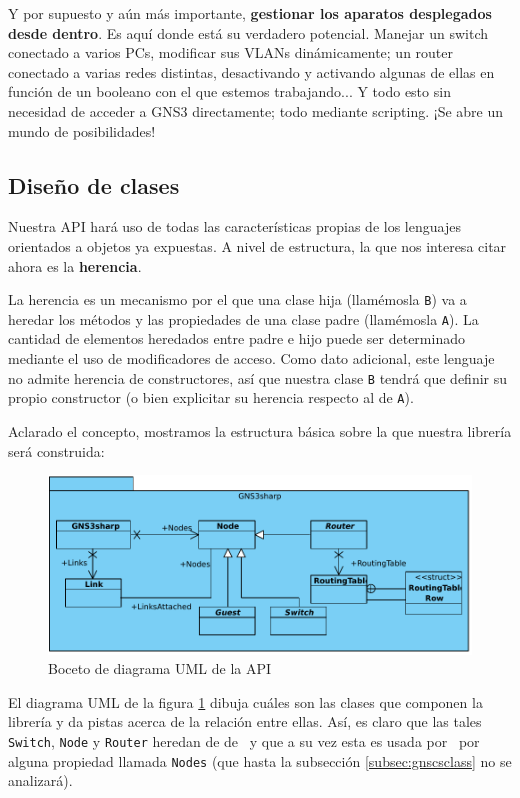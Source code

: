 Y por supuesto y aún más importante, \textbf{gestionar los aparatos desplegados desde dentro}. Es aquí donde está su verdadero potencial. Manejar un switch conectado a varios PCs, modificar sus VLANs dinámicamente; un router conectado a varias redes distintas, desactivando y activando algunas de ellas en función de un booleano con el que estemos trabajando... Y todo esto sin necesidad de acceder a GNS3 directamente; todo mediante scripting. ¡Se abre un mundo de posibilidades!

\subsection{Diseño de clases}
Nuestra API hará uso de todas las características propias de los lenguajes orientados a objetos ya expuestas. A nivel de estructura, la que nos interesa citar ahora es la \textbf{herencia}.

La herencia es un mecanismo por el que una clase hija (llamémosla \texttt{B}) va a heredar los métodos y las propiedades de una clase padre (llamémosla \texttt{A}). La cantidad de elementos heredados entre padre e hijo puede ser determinado mediante el uso de modificadores de acceso. Como dato adicional, este lenguaje no admite herencia de constructores, así que nuestra clase \texttt{B} tendrá que definir su propio constructor (o bien explicitar su herencia respecto al de \texttt{A}).

Aclarado el concepto, mostramos la estructura básica sobre la que nuestra librería será construida:

\begin{figure}[H]
  \centering
  \includegraphics[scale=0.75]{imagenes/diagrama_api1}
  \caption{Boceto de diagrama UML de la API}
  \label{fig:diagrama_api1}
\end{figure}

El diagrama UML de la figura \ref{fig:diagrama_api1} dibuja cuáles son las clases que componen la librería y da pistas acerca de la relación entre ellas. Así, es claro que las tales \texttt{Switch}, \texttt{Node} y \texttt{Router} heredan de de \NODE~y que a su vez esta es usada por \GNSCS~por alguna propiedad llamada \texttt{Nodes} (que hasta la subsección \ref{subsec:gnscsclass} no se analizará).

